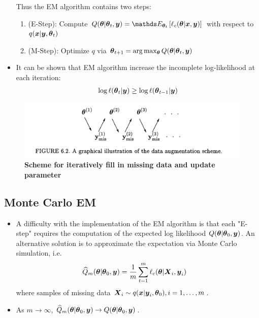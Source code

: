 \documentclass[11pt]{article}
\begin{document}
\begin{itemize}
Thus the EM algorithm contains two steps:
\begin{enumerate}
\item (E-Step): Compute $Q(\mb{\theta}|\mb{\theta}_{t}, \mb{y}) = \E{\mb{\theta}_{t}}{\ell_{c}(\mb{\theta}|\mb{x}, \mb{y})} $ with respect to $q(\boldsymbol{x}|\boldsymbol{y},\boldsymbol{\theta}_t)$
\item (M-Step): Optimize $q$ via $\boldsymbol{\theta}_{t+1} = \arg\max_{\boldsymbol{\theta}}Q(\boldsymbol{\theta}|\boldsymbol{\theta}_{t}, \boldsymbol{y})$
\end{enumerate}

\item It can be shown that EM algorithm increase the incomplete log-likelihood at each iteration:
\begin{align*}
\log\ell(\boldsymbol{\theta}_{t}|\boldsymbol{y}) \ge \log\ell(\boldsymbol{\theta}_{t-1}|\boldsymbol{y})
\end{align*}
\end{itemize}
\begin{figure}
\begin{minipage}[t]{1\linewidth}
  \centering
  \centerline{\includegraphics[scale = 0.5]{data_augmentation.png}}
\end{minipage}
\caption{\footnotesize{\textbf{Scheme for iteratively fill in missing data and update parameter \citep{liu2001monte}}}}
\label{fig: data_augmentation}
\end{figure}

\subsection{Monte Carlo EM}
\begin{itemize}
\item A difficulty with the implementation of the EM algorithm is that each "E-step" requires the computation of the expected log likelihood $Q(\boldsymbol{\theta}|\boldsymbol{\theta}_{0}, \boldsymbol{y})$. An alternative solution is to approximate the expectation via Monte Carlo simulation, i.e. 
\begin{align}
\widehat{Q}_{m}(\boldsymbol{\theta}|\boldsymbol{\theta}_{0}, \boldsymbol{y}) &= \frac{1}{m}\sum_{t=1}^{m}\ell_{c}(\boldsymbol{\theta}|\boldsymbol{X}_i, \boldsymbol{y}_i)
\end{align} where samples of missing data $\boldsymbol{X}_i \sim q(\boldsymbol{x}|\boldsymbol{y}_{i},\boldsymbol{\theta}_0), i=1,\ldots, m$.

\item As $m\rightarrow \infty$, $\widehat{Q}_{m}(\boldsymbol{\theta}|\boldsymbol{\theta}_{0}, \boldsymbol{y}) \rightarrow Q(\boldsymbol{\theta}|\boldsymbol{\theta}_{0}, \boldsymbol{y})$.


\end{itemize}


\newpage


\end{document}
